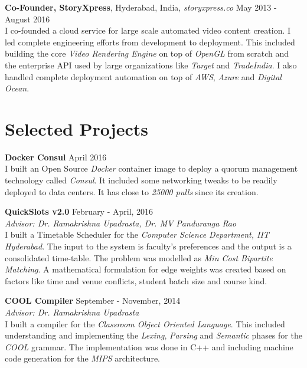 \documentclass[margin,line]{res}
\begin{document}
\begin{resume}
  \vspace*{-2.5mm}

  {\bf Co-Founder, StoryXpress}, Hyderabad, India, {\it storyxpress.co}  \hfill May 2013 - August 2016 \\
    I co-founded a cloud service for large scale automated video content creation. I led complete engineering efforts from development to deployment. This included building the core {\it Video Rendering Engine} on top of {\it OpenGL} from scratch and the enterprise API used by large organizations like {\it Target} and {\it TradeIndia}. I also handled complete deployment automation on top of {\it AWS}, {\it Azure} and {\it Digital Ocean}.

\section{\sc Selected Projects}

  {\bf Docker Consul} \hfill April 2016 \\
	I built an Open Source {\it Docker} container image to deploy a quorum management technology called {\it Consul}. It included some networking tweaks to be readily deployed to data centers. It has close to {\em 25000 pulls} since its creation.

  \vspace*{-2.5mm}

  {\bf QuickSlots v2.0} \hfill February - April, 2016 \\
  	{\it Advisor: Dr. Ramakrishna Upadrasta, Dr. MV Panduranga Rao} \vspace{0.15 \baselineskip} \\
    I built a Timetable Scheduler for the {\it Computer Science Department, IIT Hyderabad}. The input to the system is faculty's preferences and the output is a consolidated time-table. The problem was modelled as {\em Min Cost Bipartite Matching}. A mathematical formulation for edge weights was created based on factors like time and venue conflicts, student batch size and course kind.

  \vspace*{-2.5mm}

  {\bf COOL Compiler} \hfill September - November, 2014 \\
  	{\it Advisor: Dr. Ramakrishna Upadrasta} \vspace{0.15 \baselineskip} \\
  	I built a compiler for the {\it Classroom Object Oriented Language}. This included understanding and implementing the {\em Lexing}, {\em Parsing} and {\em Semantic} phases for the {\it COOL} grammar. The implementation was done in C++ and including machine code generation for the {\it MIPS} architecture.


\end{resume}
\end{document}
